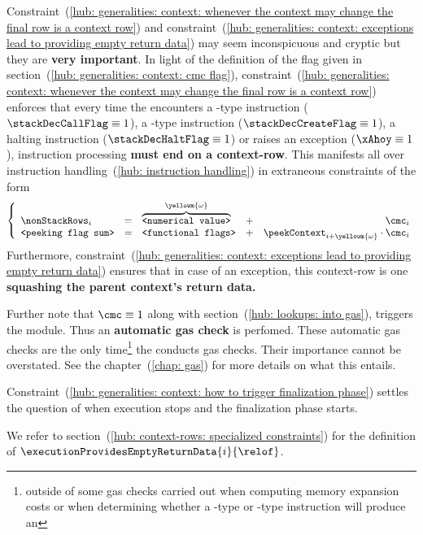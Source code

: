 Constraint~(\ref{hub: generalities: context: whenever the context may change the final row is a context row}) and
constraint~(\ref{hub: generalities: context: exceptions lead to providing empty return data})
may seem inconspicuous and cryptic but they are \textbf{very important}.
In light of the definition of the \CONTEXTMAYCHANGE{} flag given in section~(\ref{hub: generalities: context: cmc flag}),
constraint~(\ref{hub: generalities: context: whenever the context may change the final row is a context row})
enforces that every time the \zkEvm{} encounters
a -type instruction ($\stackDecCallFlag \equiv 1$),
a -type instruction ($\stackDecCreateFlag \equiv 1$),
a halting instruction ($\stackDecHaltFlag \equiv 1$) or
raises an exception ($\xAhoy \equiv 1$),
instruction processing \textbf{must end on a context-row}.
This manifests all over instruction handling~(\ref{hub: instruction handling})
in extraneous constraints of the form
\[
	\left\{ \begin{array}{lclcr}
		\nonStackRows _{i}          & = & \overbrace{\texttt{<numerical value>}}^{\yellowm{\omega}} & + & \cmc_{i}                                           \\
		\texttt{<peeking flag sum>} & = & \texttt{<functional flags>}                              & + & \peekContext_{i + \yellowm{\omega}} \cdot \cmc_{i} \\
	\end{array} \right.
\]
Furthermore,
constraint~(\ref{hub: generalities: context: exceptions lead to providing empty return data})
ensures that in case of an exception, this context-row is one \textbf{squashing the parent context's return data.}

\saNote{} \label{hub: generalities: context: automatic gas checks}
Further note that $\cmc \equiv 1$ along with section~(\ref{hub: lookups: into gas}), triggers the \gasMod{} module.
Thus an \textbf{automatic gas check} is perfomed.
These automatic gas checks are the only time\footnote{outside of some gas checks carried out when computing memory expansion costs or when determining whether a -type or -type instruction will produce an \oogxSH{}} the \zkEvm{} conducts gas checks.
Their importance cannot be overstated.
See the \gasMod{} chapter~(\ref{chap: gas}) for more details on what this entails.

\saNote{} Constraint~(\ref{hub: generalities: context: how to trigger finalization phase}) settles the question of when execution stops and the finalization phase starts.

\saNote{} We refer to section~(\ref{hub: context-rows: specialized constraints}) for the definition of $\executionProvidesEmptyReturnData {i}{\relof}$.
